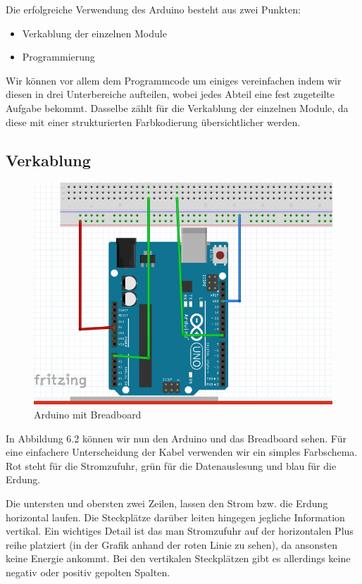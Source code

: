 Die erfolgreiche Verwendung des Arduino besteht aus zwei  Punkten:
\begin{itemize}
	\item Verkablung der einzelnen Module 
	\item Programmierung
\end{itemize}

Wir können vor allem dem Programmcode um einiges vereinfachen indem wir diesen in drei Unterbereiche aufteilen, wobei jedes Abteil eine fest zugeteilte Aufgabe bekommt. Dasselbe zählt für die Verkablung der einzelnen Module, da diese mit einer strukturierten Farbkodierung übersichtlicher werden.


\subsection{Verkablung}
\begin{figure}[h]
	
	\includegraphics[width=0.7\linewidth]{figures/VerkablungStrukturplan.png}
	\caption{Arduino mit Breadboard}
	\label{fig:verkablungstrukturplan}
\end{figure}

In Abbildung  6.2 können wir nun den Arduino und das Breadboard sehen.  Für eine einfachere Unterscheidung der Kabel verwenden wir ein simples Farbschema. Rot steht für die Stromzufuhr, grün für die Datenauslesung und blau für die Erdung.


Die untersten und obersten zwei Zeilen, lassen den Strom bzw. die Erdung horizontal laufen.  Die Steckplätze darüber leiten hingegen jegliche Information vertikal. Ein wichtiges Detail ist das man Stromzufuhr auf der horizontalen Plus reihe platziert (in der Grafik anhand der roten Linie zu sehen), da ansonsten keine Energie ankommt. Bei den vertikalen Steckplätzen gibt es allerdings keine negativ oder positiv gepolten Spalten.

